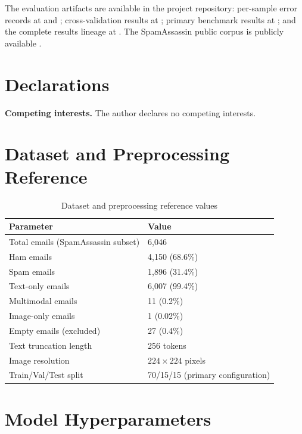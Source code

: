 \documentclass[10pt,twoside]{article}
\begin{document}
\sloppy
The evaluation artifacts are available in the project repository: per-sample error records at  and ; cross-validation results at ; primary benchmark results at ; and the complete results lineage at . The SpamAssassin public corpus is publicly available \citep{spamassassin2006}.

\section*{Declarations}

\textbf{Competing interests.} The author declares no competing interests.

\appendix

\section{Dataset and Preprocessing Reference}\label{app:dataset}

\begin{table}[h]
\centering
\caption{Dataset and preprocessing reference values}
\label{tab:appdataset}
\small
\begin{tabular}{ll}
\toprule
Parameter & Value \\
\midrule
Total emails (SpamAssassin subset) & 6,046 \\
Ham emails & 4,150 (68.6\%) \\
Spam emails & 1,896 (31.4\%) \\
Text-only emails & 6,007 (99.4\%) \\
Multimodal emails & 11 (0.2\%) \\
Image-only emails & 1 (0.02\%) \\
Empty emails (excluded) & 27 (0.4\%) \\
Text truncation length & 256 tokens \\
Image resolution & $224 \times 224$ pixels \\
Train/Val/Test split & 70/15/15 (primary configuration) \\
\bottomrule
\end{tabular}
\end{table}

\section{Model Hyperparameters}\label{app:hyperparams}
\end{document}

